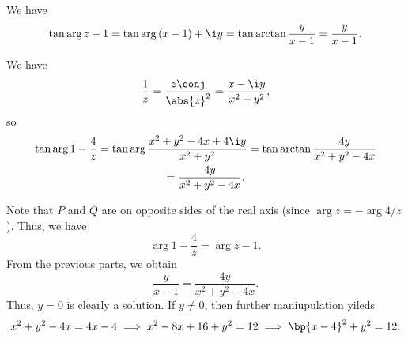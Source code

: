 \begin{solution}
    \begin{ppart}
        We have \[\tan{\arg{z-1}} = \tan{\arg{(x-1) + \i y}} = \tan \arctan{\frac{y}{x-1}} = \frac{y}{x-1}.\]
    \end{ppart}
    \begin{ppart}
        We have \[\frac{1}{z} = \frac{z\conj}{\abs{z}^2} = \frac{x - \i y}{x^2 + y^2},\] so
        \begin{gather*}
            \tan{\arg{1 - \frac4z}} = \tan{\arg{\frac{x^2 + y^2 - 4x + 4\i y}{x^2 + y^2}}} = \tan \arctan{\frac{4y}{x^2 + y^2 - 4x}}\\
            = \frac{4y}{x^2 + y^2 - 4x}.
        \end{gather*}
    \end{ppart}
    \begin{ppart}
        Note that $P$ and $Q$ are on opposite sides of the real axis (since $\arg{z} = -\arg{4/z}$). Thus, we have \[\arg{1 - \frac4z} = \arg{z-1}.\] From the previous parts, we obtain \[\frac{y}{x - 1} = \frac{4y}{x^2 + y^2 - 4x}.\] Thus, $y = 0$ is clearly a solution. If $y \neq 0$, then further maniupulation yileds \[x^2 + y^2 - 4x = 4x - 4 \implies x^2 - 8x + 16 + y^2 = 12 \implies \bp{x - 4}^2 + y^2 = 12.\]

        \begin{center}
\end{center}
\end{ppart}
\end{solution}
